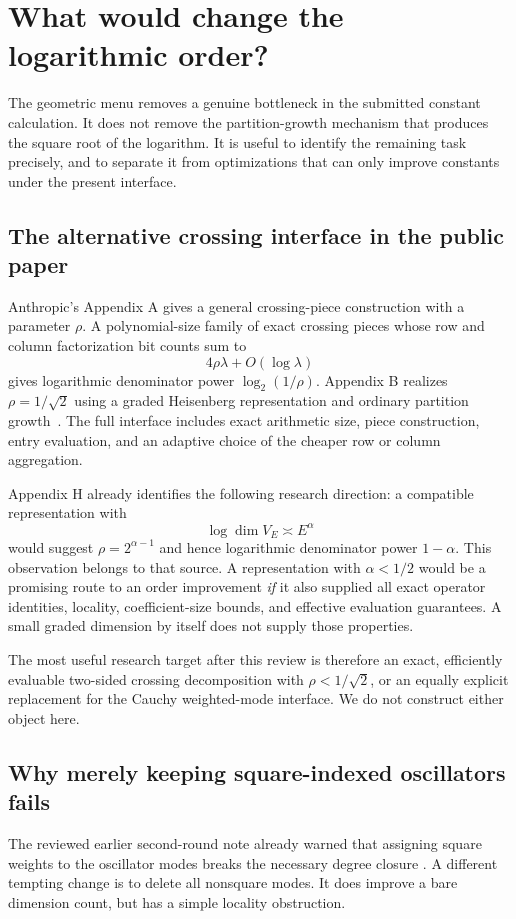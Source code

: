 \section{What would change the logarithmic order?}
\label{sec:research}

The geometric menu removes a genuine bottleneck in the submitted
constant calculation. It does not remove the partition-growth mechanism
that produces the square root of the logarithm. It is useful to identify
the remaining task precisely, and to separate it from optimizations that
can only improve constants under the present interface.

\subsection{The alternative crossing interface in the public paper}
Anthropic's Appendix A gives a general crossing-piece construction with
a parameter $\rho$. A polynomial-size family of exact crossing pieces
whose row and column factorization bit counts sum to
\[
 4\rho\lambda+O(\log\lambda)
\]
gives logarithmic denominator power $\log_2(1/\rho)$. Appendix B realizes
$\rho=1/\sqrt2$ using a graded Heisenberg representation and ordinary
partition growth~\cite{anthropic-paper}. The full interface includes exact
arithmetic size, piece construction, entry evaluation, and an adaptive
choice of the cheaper row or column aggregation.

Appendix H already identifies the following research direction: a compatible
representation with
\[
 \log\dim V_E\asymp E^\alpha
\]
would suggest $\rho=2^{\alpha-1}$ and hence logarithmic denominator power
$1-\alpha$. This observation belongs to that source. A representation with
$\alpha<1/2$ would be a promising route to an order improvement \emph{if}
it also supplied all exact operator identities, locality, coefficient-size
bounds, and effective evaluation guarantees. A small graded dimension by
itself does not supply those properties.

The most useful research target after this review is therefore an exact,
efficiently evaluable two-sided crossing decomposition with
$\rho<1/\sqrt2$, or an equally explicit replacement for the Cauchy
weighted-mode interface. We do not construct either object here.

\subsection{Why merely keeping square-indexed oscillators fails}
The reviewed earlier second-round note already warned that assigning square
weights to the oscillator modes breaks the necessary degree closure
\cite{degree-barrier}. A different tempting change is to delete all
nonsquare modes. It does improve a bare dimension count, but has a simple
locality obstruction.

